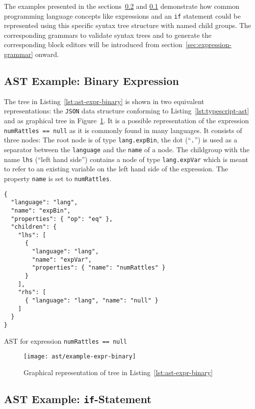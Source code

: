 \documentclass[sigconf,natbib=false]{acmart}
\newcommand\astScale{0.7}
\begin{document}
The examples presented in the sections~\ref{sec:ast-example-if} and \ref{sec:ast-example-expr} demonstrate how common programming language concepts like expressions and an \texttt{if} statement could be represented using this specific syntax tree structure with named child groups. The corresponding grammars to validate syntax trees and to generate the corresponding block editors will be introduced from section~\ref{sec:expression-grammar} onward.

\subsection{AST Example: Binary Expression}
\label{sec:ast-example-expr}
The tree in Listing~\ref{lst:ast-expr-binary} is shown in two equivalent representations: the \texttt{JSON} data structure conforming to Listing~\ref{lst:typescript-ast} and as graphical tree in Figure~\ref{fig:ast-expr-binary}. It is a possible representation of the expression \texttt{numRattles == null} as it is commonly found in many languages. It consists of three nodes: The root node is of type \texttt{lang.expBin}, the dot (\enquote{\texttt{.}}) is used as a separator between the \texttt{language} and the \texttt{name} of a node. The childgroup with the name \texttt{lhs} (\enquote{left hand side}) contains a node of type \texttt{lang.expVar} which is meant to refer to an existing variable on the left hand side of the expression. The property \texttt{name} is set to \texttt{numRattles}.

\begin{listing}[H]
\begin{verbatim}
{
  "language": "lang",
  "name": "expBin",
  "properties": { "op": "eq" },
  "children": {
    "lhs": [
      {
        "language": "lang",
        "name": "expVar",
        "properties": { "name": "numRattles" }
      }
    ],
    "rhs": [
      { "language": "lang", "name": "null" }
    ]
  }
}
\end{verbatim}
\caption{AST for expression \texttt{numRattles == null}}
\label{lst:ast-expr-binary}
\end{listing}

\begin{figure}
  \texttt{[image: ast/example-expr-binary]}
  \caption{Graphical representation of tree in Listing~\ref{lst:ast-expr-binary}}
  \label{fig:ast-expr-binary}
\end{figure}


\subsection{AST Example: \texttt{if}-Statement}
\label{sec:ast-example-if}
\end{document}
